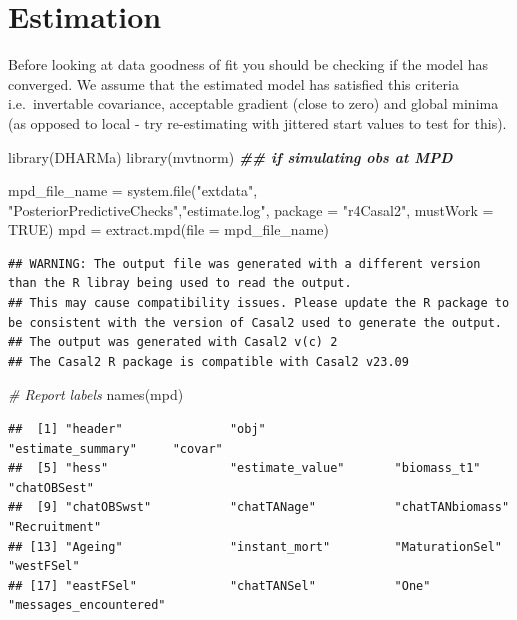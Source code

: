 \documentclass[
]{book}
\newenvironment{Shaded}{\begin{snugshade}}{\end{snugshade}}
\newcommand{\AttributeTok}[1]{\textcolor[rgb]{0.77,0.63,0.00}{#1}}
\newcommand{\CommentTok}[1]{\textcolor[rgb]{0.56,0.35,0.01}{\textit{#1}}}
\newcommand{\ConstantTok}[1]{\textcolor[rgb]{0.00,0.00,0.00}{#1}}
\newcommand{\DocumentationTok}[1]{\textcolor[rgb]{0.56,0.35,0.01}{\textbf{\textit{#1}}}}
\newcommand{\FunctionTok}[1]{\textcolor[rgb]{0.00,0.00,0.00}{#1}}
\newcommand{\NormalTok}[1]{#1}
\newcommand{\OtherTok}[1]{\textcolor[rgb]{0.56,0.35,0.01}{#1}}
\newcommand{\StringTok}[1]{\textcolor[rgb]{0.31,0.60,0.02}{#1}}
\begin{document}
\hypertarget{estimation}{%
\section{Estimation}\label{estimation}}

Before looking at data goodness of fit you should be checking if the model has converged. We assume that the estimated model has satisfied this criteria i.e.~invertable covariance, acceptable gradient (close to zero) and global minima (as opposed to local - try re-estimating with jittered start values to test for this).

\begin{Shaded}
\begin{Highlighting}[]
\FunctionTok{library}\NormalTok{(DHARMa)}
\FunctionTok{library}\NormalTok{(mvtnorm) }\DocumentationTok{\#\# if simulating obs at MPD}

\NormalTok{mpd\_file\_name }\OtherTok{=} \FunctionTok{system.file}\NormalTok{(}\StringTok{"extdata"}\NormalTok{, }\StringTok{"PosteriorPredictiveChecks"}\NormalTok{,}\StringTok{"estimate.log"}\NormalTok{, }
                            \AttributeTok{package =} \StringTok{"r4Casal2"}\NormalTok{, }\AttributeTok{mustWork =} \ConstantTok{TRUE}\NormalTok{)}
\NormalTok{mpd }\OtherTok{=} \FunctionTok{extract.mpd}\NormalTok{(}\AttributeTok{file =}\NormalTok{ mpd\_file\_name)}
\end{Highlighting}
\end{Shaded}

\begin{verbatim}
## WARNING: The output file was generated with a different version than the R libray being used to read the output.
## This may cause compatibility issues. Please update the R package to be consistent with the version of Casal2 used to generate the output.
## The output was generated with Casal2 v(c) 2
## The Casal2 R package is compatible with Casal2 v23.09
\end{verbatim}

\begin{Shaded}
\begin{Highlighting}[]
\CommentTok{\# Report labels}
\FunctionTok{names}\NormalTok{(mpd)}
\end{Highlighting}
\end{Shaded}

\begin{verbatim}
##  [1] "header"               "obj"                  "estimate_summary"     "covar"               
##  [5] "hess"                 "estimate_value"       "biomass_t1"           "chatOBSest"          
##  [9] "chatOBSwst"           "chatTANage"           "chatTANbiomass"       "Recruitment"         
## [13] "Ageing"               "instant_mort"         "MaturationSel"        "westFSel"            
## [17] "eastFSel"             "chatTANSel"           "One"                  "messages_encountered"
\end{verbatim}
\end{document}
